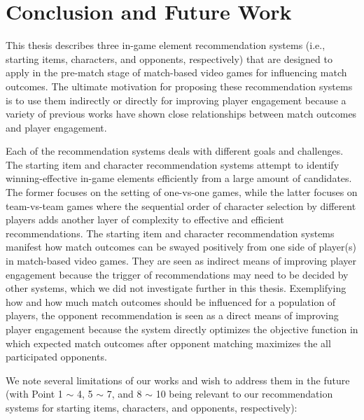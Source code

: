 \chapter{Conclusion and Future Work} %

\label{chapter:conclusion} 

This thesis describes three in-game element recommendation systems (i.e., starting items, characters, and opponents, respectively) that are designed to apply in the pre-match stage of match-based video games for influencing match outcomes. The ultimate motivation for proposing these recommendation systems is to use them indirectly or directly for improving player engagement because a variety of previous works have shown close relationships between match outcomes and player engagement. 

Each of the recommendation systems deals with different goals and challenges. The starting item and character recommendation systems attempt to identify winning-effective in-game elements efficiently from a large amount of candidates. The former focuses on the setting of one-vs-one games, while the latter focuses on team-vs-team games where the sequential order of character selection by different players adds another layer of complexity to effective and efficient recommendations. The starting item and character recommendation systems manifest how match outcomes can be swayed positively from one side of player(s) in match-based video games. They are seen as indirect means of improving player engagement because the trigger of recommendations may need to be decided by other systems, which we did not investigate further in this thesis. Exemplifying how and how much match outcomes should be influenced for a population of players, the opponent recommendation is seen as a direct means of improving player engagement because the system directly optimizes the objective function in which expected match outcomes after opponent matching maximizes the all participated opponents. 

We note several limitations of our works and wish to address them in the future (with Point 1 $\sim$ 4, 5 $\sim$ 7, and 8 $\sim$ 10 being relevant to our recommendation systems for starting items, characters, and opponents, respectively):

